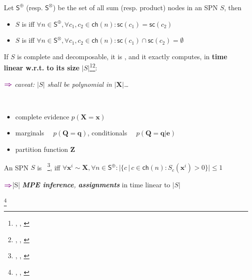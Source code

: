 \documentclass[xcolor={usenames,dvipsnames,svgnames}, compress, aspectratio=169, 11pt]{beamer}
\newcommand{\nodeset}[1]{\bm{\mathsf{#1}}}
\newcommand{\cbar}{\,|\,}
\newcommand{\customcite}[1]{\footnote{\tiny \citeauthor{#1},
    \citetitle{#1}, \citeyear{#1}}}
\begin{document}
\begin{frame}[t]
    \frametitle{}
    \footnotesize
    \vspace{5pt}
    Let $\nodeset{S}^{\oplus}$ (resp. $\nodeset{S}^{\otimes}$) be the set of all sum
    (resp. product) nodes in an SPN $S$, then 
    \begin{itemize}
      \setlength{\itemsep}{0pt}  
\item    $S$ is  iff $\forall n\in
  \nodeset{S}^{\oplus},\forall c_{1}, c_{2}\in \mathsf{ch}(n):
  \mathsf{sc}(c_{1})=\mathsf{sc}(c_{2})$
\item    $S$ is  iff $\forall n\in
  \nodeset{S}^{\otimes},\forall c_{1}, c_{2}\in \mathsf{ch}(n)%
  :
  \mathsf{sc}(c_{1})\cap\mathsf{sc}(c_{2})=\emptyset$
\end{itemize}\par\bigskip

If $S$ is complete and decomposable,  it is
 ,
and it exactly
computes, in \textbf{time linear w.r.t. to its size}
$|S|$\customcite{Darwiche2009}\customcite{Poon2011}:
\begin{minipage}{1.0\linewidth}
  \vspace{2pt}
      \raggedleft
      $\color{violet}\boldsymbol\Rightarrow$
\emph{caveat:  $|S|$ shall be polynomial in $|\mathbf{X}|$\dots}
\end{minipage}\\[-10pt]
\begin{itemize}
  \setlength{\itemsep}{0pt}  
\item  complete evidence $p(\mathbf{X}=\mathbf{x})$
\item marginals $\quad p(\mathbf{Q}=\mathbf{q})$, conditionals $\quad p(\mathbf{Q}=\mathbf{q}|\mathbf{e})$
\item partition function $\mathbf{Z}$
\end{itemize}
\par\bigskip

An SPN $S$ is 
~\customcite{Peharz2014b}, iff $\forall \mathbf{x}^{i}\sim\mathbf{X},\forall
n\in\nodeset{S}^{\oplus}\colon
|\{c \cbar c\in\mathsf{ch}(n):S_{c}(\mathbf{x}^{i})>0\}|
\leq 1$\par
\begin{minipage}{1.0\linewidth}
  \vspace{2pt}
      \raggedleft
      $\color{violet}\boldsymbol\Rightarrow$|S|
\emph{\textbf{MPE inference}, \textbf{assignments}} in time
linear to $|S|$
\end{minipage}\customcite{Choi2017}
\end{frame}
\end{document}
